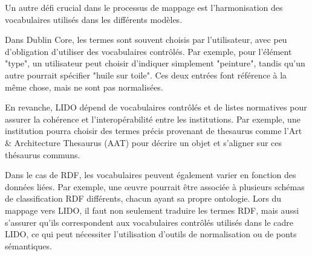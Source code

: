 Un autre défi crucial dans le processus de mappage est l'harmonisation des vocabulaires utilisés dans les différents modèles.\newline

Dans Dublin Core, les termes sont souvent choisis par l’utilisateur, avec peu d'obligation d'utiliser des vocabulaires contrôlés. Par exemple, pour l'élément "type", un utilisateur peut choisir d’indiquer simplement "peinture", tandis qu’un autre pourrait spécifier "huile sur toile". Ces deux entrées font référence à la même chose, mais ne sont pas normalisées.\newline

En revanche, LIDO dépend de vocabulaires contrôlés et de listes normatives pour assurer la cohérence et l'interopérabilité entre les institutions. Par exemple, une institution pourra choisir des termes précis provenant de thesaurus comme l’Art \& Architecture Thesaurus (AAT) pour décrire un objet et s'aligner sur ces thésaurus communs. \newline

Dans le cas de RDF, les vocabulaires peuvent également varier en fonction des données liées. Par exemple, une œuvre pourrait être associée à plusieurs schémas de classification RDF différents, chacun ayant sa propre ontologie. Lors du mappage vers LIDO, il faut non seulement traduire les termes RDF, mais aussi s'assurer qu'ils correspondent aux vocabulaires contrôlés utilisés dans le cadre LIDO, ce qui peut nécessiter l'utilisation d'outils de normalisation ou de ponts sémantiques. \newline
